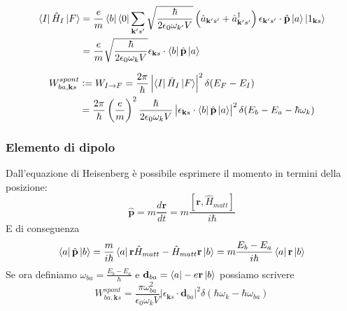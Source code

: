 \documentclass{beamer}
\begin{document}
\begin{frame}
  \frametitle{}
  \begin{align*}
    \bra{I} \hat{H}_I \ket{F} & =  \frac{e}{m} \bra{b}\bra{0} \sum_{\mathbf{k'}s'} \sqrt{\frac{\hbar}{2\epsilon_0\omega_{k'}V}}
    \left(\hat{a}_{\mathbf{k'}s'} + \hat{a}_{\mathbf{k'}s'}^\dagger \right) \epsilon_{\mathbf{k'}s'} \cdot \hat{\mathbf{p}} \ket{a}\ket{1_{\mathbf{k}s}}\\
     & = \frac{e}{m} \sqrt{\frac{\hbar}{2\epsilon_0\omega_{k}V}} \epsilon_{\mathbf{k}s} \cdot \bra{b} \hat{\mathbf{p}} \ket{a}
  \end{align*}

  \begin{align*}
    W_{ba,\mathbf{k}s}^{spont} & :=  W_{I \to F} = \frac{2\pi}{\hbar} \left| \bra{I} \hat{H}_I \ket{F} \right|^2 \delta(E_F - E_I) \\
    & = \frac{2\pi}{\hbar} \left(\frac{e}{m}\right)^2 \frac{\hbar}{2\epsilon_0\omega_{k}V}
    \left| \epsilon_{\mathbf{k}s} \cdot \bra{b} \hat{\mathbf{p}} \ket{a} \right|^2 \delta(E_b - E_a - \hbar\omega_k)
  \end{align*}
\end{frame}

\begin{frame}
  \frametitle{Elemento di dipolo}
  Dall'equazione di Heisenberg è possibile esprimere il momento in termini della posizione:
  \begin{equation*}
    \hat{\mathbf{p}} = m \frac{d \mathbf{r}}{dt} = m \frac{[\mathbf{r}, \hat{H}_{matt}]}{i\hbar}
  \end{equation*}
  E di conseguenza
  \begin{equation*}
    \bra{a} \hat{\mathbf{p}} \ket{b} = \frac{m}{i\hbar}\bra{a} \mathbf{r}\hat{H}_{matt} - \hat{H}_{matt}\mathbf{r} \ket{b}
    = m\frac{E_b - E_a}{i\hbar} \bra{a} \mathbf{r} \ket{b}
  \end{equation*}
  Se ora definiamo $\omega_{ba} = \frac{E_b - E_a}{\hbar}$ e $\mathbf{d}_{ba} = \bra{a} -e\mathbf{r} \ket{b}$ possiamo scrivere
  \begin{equation*}
    W_{ba,\mathbf{k}s}^{spont} = \frac{\pi \omega_{ba}^2}{\epsilon_0\omega_kV} \left|\epsilon_{\mathbf{k}s} \cdot \mathbf{d}_{ba} \right|^2
    \delta(\hbar \omega_k - \hbar \omega_{ba})
  \end{equation*}
\end{frame}
\end{document}
